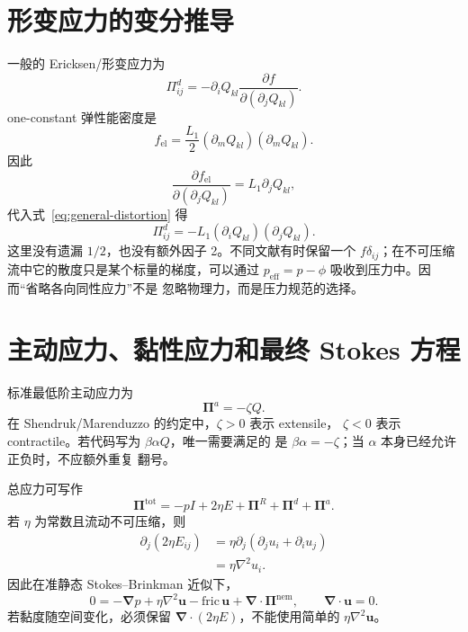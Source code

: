 \documentclass[UTF8,11pt,a4paper]{ctexart}
\newcommand{\pinem}{\bm{\Pi}^{\mathrm{nem}}}
\newcommand{\pireac}{\bm{\Pi}^{R}}
\newcommand{\pidist}{\bm{\Pi}^{d}}
\newcommand{\piact}{\bm{\Pi}^{a}}
\begin{document}
\section{形变应力的变分推导}

一般的 Ericksen/形变应力为
\begin{equation}
  \Pi^d_{ij}
  =-\partial_iQ_{kl}
  \frac{\partial f}{\partial(\partial_jQ_{kl})}.
  \label{eq:general-distortion}
\end{equation}
one-constant 弹性能密度是
\begin{equation}
  f_{\mathrm{el}}
  =\frac{L_1}{2}(\partial_mQ_{kl})(\partial_mQ_{kl}).
\end{equation}
因此
\begin{equation}
  \frac{\partial f_{\mathrm{el}}}
       {\partial(\partial_jQ_{kl})}
  =L_1\partial_jQ_{kl},
\end{equation}
代入式~\eqref{eq:general-distortion} 得
\begin{equation}
\boxed{
  \Pi^d_{ij}=-L_1(\partial_iQ_{kl})(\partial_jQ_{kl}).
}
\label{eq:distortion-stress}
\end{equation}
这里没有遗漏 $1/2$，也没有额外因子 2。不同文献有时保留一个
$f\delta_{ij}$；在不可压缩流中它的散度只是某个标量的梯度，可以通过
$p_{\mathrm{eff}}=p-\phi$ 吸收到压力中。因而“省略各向同性应力”不是
忽略物理力，而是压力规范的选择。

\section{主动应力、黏性应力和最终 Stokes 方程}

标准最低阶主动应力为
\begin{equation}
  \piact=-\zeta Q.
\end{equation}
在 Shendruk/Marenduzzo 的约定中，$\zeta>0$ 表示 extensile，
$\zeta<0$ 表示 contractile。若代码写为 $\beta\alpha Q$，唯一需要满足的
是 $\beta\alpha=-\zeta$；当 $\alpha$ 本身已经允许正负时，不应额外重复
翻号。

总应力可写作
\begin{equation}
  \bm\Pi^{\mathrm{tot}}
  =-pI+2\eta E+\pireac+\pidist+\piact.
\end{equation}
若 $\eta$ 为常数且流动不可压缩，则
\begin{equation}
\begin{aligned}
\partial_j(2\eta E_{ij})
&=\eta\partial_j(\partial_j u_i+\partial_i u_j)\\
&=\eta\nabla^2u_i.
\end{aligned}
\end{equation}
因此在准静态 Stokes--Brinkman 近似下，
\begin{equation}
\boxed{
0=-\bm\nabla p+\eta\nabla^2\bm u
-\mathrm{fric}\,\bm u
+\bm\nabla\!\cdot\pinem,
\qquad \bm\nabla\!\cdot\bm u=0.
}
\label{eq:stokes}
\end{equation}
若黏度随空间变化，必须保留 $\bm\nabla\!\cdot(2\eta E)$，不能使用简单的
$\eta\nabla^2\bm u$。
\end{document}
